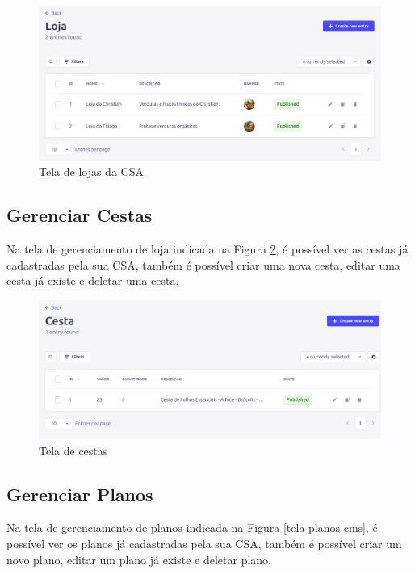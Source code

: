 \begin{figure}[h]
	\centering
	\includegraphics[keepaspectratio=true,scale=0.28]{figuras/painel_lojas.png}
	\caption{Tela de lojas da CSA}
        \label{tela-lojas-cms}
\end{figure}

\subsection{Gerenciar Cestas}
Na tela de gerenciamento de loja indicada na Figura \ref{tela-cestas-cms}, é possível ver as cestas já cadastradas pela sua CSA, também é possível criar uma nova cesta, editar uma cesta já existe e deletar uma cesta.

\begin{figure}[h]
	\centering
	\includegraphics[keepaspectratio=true,scale=0.28]{figuras/painel_cestas.png}
	\caption{Tela de cestas}
        \label{tela-cestas-cms}
\end{figure}

\subsection{Gerenciar Planos}
Na tela de gerenciamento de planos indicada na Figura \ref{tela-planos-cms}, é possível ver os planos já cadastradas pela sua CSA, também é possível criar um novo plano, editar um plano já existe e deletar plano.

